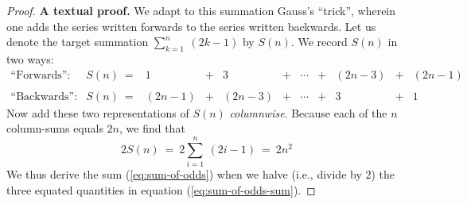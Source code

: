 \begin{proof}
{\bf A textual proof.}
%
We adapt to this summation Gauss's ``trick'', wherein one adds the series written
forwards to the series written backwards.  Let us
denote the target summation $\sum_{k=1}^n \ (2k-1)$ by $S(n)$.  We record
$S(n)$ in two ways:
\begin{equation}
\label{eq:add-odds}
\begin{array}{llccccccccc}
\mbox{``Forwards'':} &
S(n) \ = 
& 1 & + & 3 & + & \cdots & + & (2n-3) & + & (2n-1) \\
 & & & & & & & & & &  \\
\mbox{``Backwards'':} &
S(n) \ =
& (2n-1) & + & (2n-3) & + & \cdots & + & 3 & + & 1
\end{array}
\end{equation}
Now add these two representations of $S(n)$ {\em columnwise}.  Because
each of the $n$ column-sums equals $2n$, we find that
\begin{equation}
\label{eq:sum-of-odds-sum}
2 S(n) \ = \ 2 \sum_{i=1}^n \ (2i-1) \ = \ 2n^2
\end{equation}
We thus derive the sum (\ref{eq:sum-of-odds}) when we halve (i.e., divide by $2$) the three
equated quantities in equation (\ref{eq:sum-of-odds-sum}).
\end{proof}

\medskip

